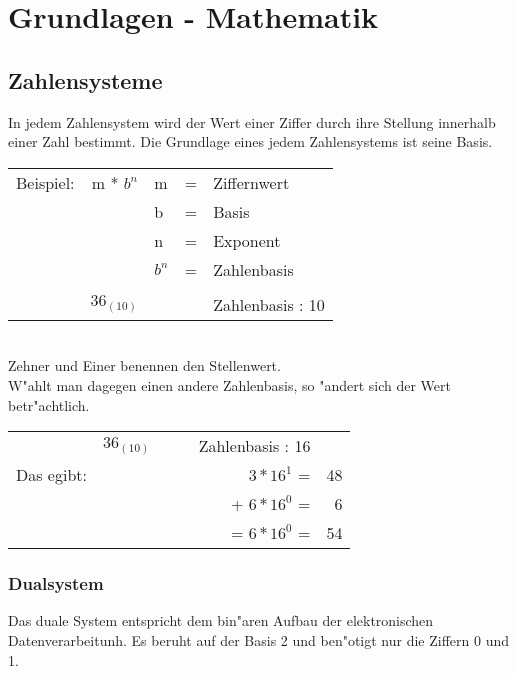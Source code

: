 \chapter{Grundlagen - Mathematik}\label{Mathegrundlagen}
\section{Zahlensysteme}\label{Zahlensysteme}
In jedem Zahlensystem wird der Wert einer Ziffer durch ihre Stellung
innerhalb einer Zahl bestimmt. Die Grundlage eines jedem Zahlensystems ist
seine Basis.
\\
\begin{minipage}{1.5\textwidth}
\begin{tabular}{lrlcl}
Beispiel:  & m * $b^n$    & m     & = & Ziffernwert \\
           &              & b     & = & Basis \\
           &              & n     & = & Exponent \\
           &              & $b^n$ & = & Zahlenbasis \\
           &              &       &   & \\
           & $36_{(10)}$  &       &   & Zahlenbasis : 10 \\
\end{tabular}
\end{minipage}
\\
Zehner und Einer benennen den Stellenwert.\\
W"ahlt man dagegen einen andere Zahlenbasis, so "andert sich der Wert betr"achtlich.\\
\begin{minipage}{1.5\textwidth}
\begin{tabular}{lrlcrr}
           & $36_{(10)}$  &       &   &   Zahlenbasis : 16 & \\
Das egibt: &              &       &   &   $3 * 16^1$ =     & 48 \\
           &              &       &   & + $6 * 16^0$ =     &  6 \\
           &              &       &   & = $6 * 16^0$ =     & 54 \\
\end{tabular}
\end{minipage}

\subsection{Dualsystem}
Das duale System entspricht dem bin"aren Aufbau der elektronischen Datenverarbeitunh.
Es beruht auf der Basis 2 und ben"otigt nur die Ziffern 0 und 1.\\


